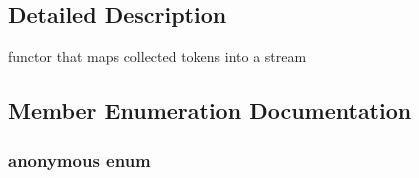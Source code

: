 \subsection{Detailed Description}
functor that maps collected tokens into a stream 

\subsection{Member Enumeration Documentation}
\hypertarget{classCacheStreamer__c_a9448525bd59b03890ae82c26a8f46fcf}{\subsubsection[{anonymous enum}]{\setlength{\rightskip}{0pt plus 5cm}anonymous enum\hspace{0.3cm}{\ttfamily [private]}}}\label{classCacheStreamer__c_a9448525bd59b03890ae82c26a8f46fcf}
